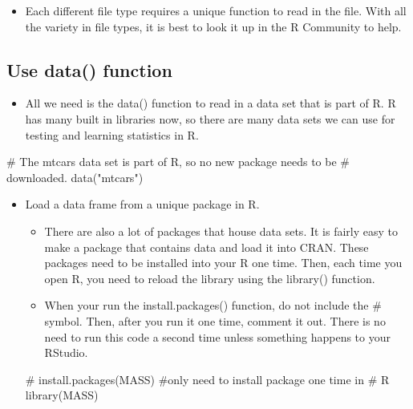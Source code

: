 \documentclass[
  letterpaper,
  DIV=11,
  numbers=noendperiod]{scrreprt}
\newenvironment{Shaded}{\begin{snugshade}}{\end{snugshade}}
\newcommand{\CommentTok}[1]{\textcolor[rgb]{0.37,0.37,0.37}{#1}}
\newcommand{\FunctionTok}[1]{\textcolor[rgb]{0.28,0.35,0.67}{#1}}
\newcommand{\NormalTok}[1]{\textcolor[rgb]{0.00,0.23,0.31}{#1}}
\newcommand{\StringTok}[1]{\textcolor[rgb]{0.13,0.47,0.30}{#1}}
\providecommand{\tightlist}{%
  \setlength{\itemsep}{0pt}\setlength{\parskip}{0pt}}\usepackage{longtable,booktabs,array}
\begin{document}
\begin{itemize}
\tightlist
\item
  Each different file type requires a unique function to read in the
  file. With all the variety in file types, it is best to look it up in
  the R Community to help.
\end{itemize}

\subsection{Use data() function}\label{use-data-function}

\begin{itemize}
\tightlist
\item
  All we need is the data() function to read in a data set that is part
  of R. R has many built in libraries now, so there are many data sets
  we can use for testing and learning statistics in R.
\end{itemize}

\begin{Shaded}
\begin{Highlighting}[]
\CommentTok{\# The mtcars data set is part of R, so no new package needs to be}
\CommentTok{\# downloaded.}
\FunctionTok{data}\NormalTok{(}\StringTok{"mtcars"}\NormalTok{)}
\end{Highlighting}
\end{Shaded}

\begin{itemize}
\item
  Load a data frame from a unique package in R.

  \begin{itemize}
  \tightlist
  \item
    There are also a lot of packages that house data sets. It is fairly
    easy to make a package that contains data and load it into CRAN.
    These packages need to be installed into your R one time. Then, each
    time you open R, you need to reload the library using the library()
    function.
  \item
    When your run the install.packages() function, do not include the \#
    symbol. Then, after you run it one time, comment it out. There is no
    need to run this code a second time unless something happens to your
    RStudio.
  \end{itemize}

\begin{Shaded}
\begin{Highlighting}[]
\CommentTok{\# install.packages(\textquotesingle{}MASS\textquotesingle{}) \#only need to install package one time in}
\CommentTok{\# R}
\FunctionTok{library}\NormalTok{(MASS)}
\end{Highlighting}
\end{Shaded}
\end{itemize}
\end{document}
